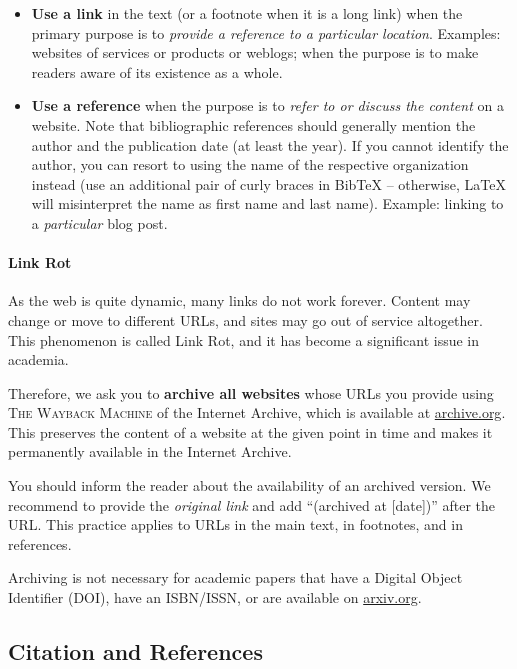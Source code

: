 \begin{itemize}
  \item \textbf{Use a link} in the text (or a footnote when it is a long link) when the primary purpose is to \emph{provide a reference to a particular location}. Examples: websites of services or products or weblogs; when the purpose is to make readers aware of its existence as a whole.
  \item \textbf{Use a reference} when the purpose is to \emph{refer to or discuss the content} on a website. Note that bibliographic references should generally mention the author and the publication date (at least the year). If you cannot identify the author, you can resort to using the name of the respective organization instead (use an additional pair of curly braces in BibTeX -- otherwise, LaTeX will misinterpret the name as first name and last name). Example: linking to a \emph{particular} blog post.
\end{itemize}

\paragraph{Link Rot}

As the web is quite dynamic, many links do not work forever.%
Content may change or move to different URLs, and sites may go out of service altogether. This phenomenon is called Link Rot, and it has become a significant issue in academia.

Therefore, we ask you to \textbf{archive all websites} whose URLs you provide using \textsc{The Wayback Machine} of the Internet Archive, which is available at \url{archive.org}.
This preserves the content of a website at the given point in time and makes it permanently available in the Internet Archive.

You should inform the reader about the availability of an archived version.%
We recommend to provide the \emph{original link} and add ``(archived at [date])'' after the URL. This practice applies to URLs in the main text, in footnotes, and in references.

Archiving is not necessary for academic papers that have a Digital Object Identifier (DOI), have an ISBN/ISSN, or are available on \url{arxiv.org}.


\subsection{Citation and References}

